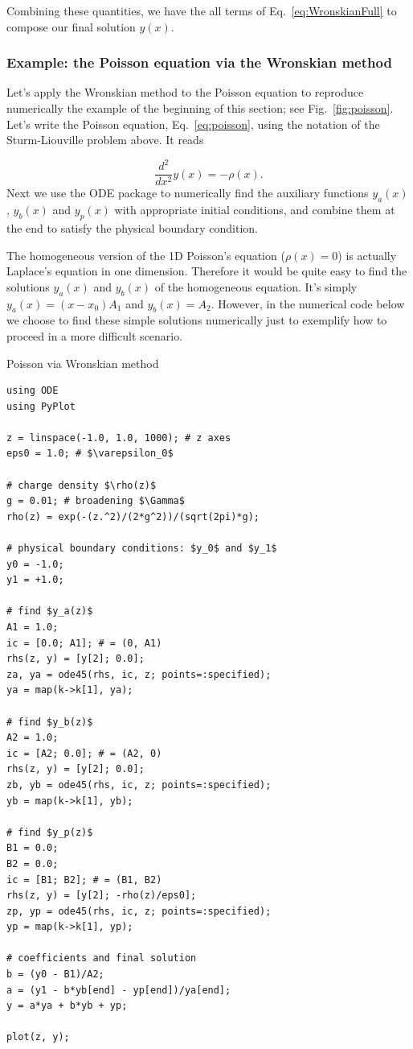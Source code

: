 Combining these quantities, we have the all terms of Eq.~\eqref{eq:WronskianFull} to compose our final solution $y(x)$.

\subsubsection{Example: the Poisson equation via the Wronskian method}

Let's apply the Wronskian method to the Poisson equation to reproduce numerically the example of the beginning of this section; see Fig.~\ref{fig:poisson}. Let's write the Poisson equation, Eq.~\eqref{eq:poisson}, using the notation of the Sturm-Liouville problem above. It reads

\begin{equation}
 \dfrac{d^2}{dx^2} y(x) = -\rho(x).
\end{equation}
Next we use the ODE package to numerically find the auxiliary functions $y_a(x)$, $y_b(x)$ and $y_p(x)$ with appropriate initial conditions, and combine them at the end to satisfy the physical boundary condition.

The homogeneous version of the 1D Poisson's equation ($\rho(x) = 0$) is actually Laplace's equation in one dimension. Therefore it would be quite easy to find the solutions $y_a(x)$ and $y_b(x)$ of the homogeneous equation. It's simply $y_a(x) = (x-x_0)A_1$ and $y_b(x) = A_2$. However, in the numerical code below we choose to find these simple solutions numerically just to exemplify how to proceed in a more difficult scenario.

\begin{example}{Poisson via Wronskian method}
\label{ex:poissonWronskian}
\begin{verbatim}
using ODE
using PyPlot

z = linspace(-1.0, 1.0, 1000); # z axes
eps0 = 1.0; # $\varepsilon_0$

# charge density $\rho(z)$
g = 0.01; # broadening $\Gamma$
rho(z) = exp(-(z.^2)/(2*g^2))/(sqrt(2pi)*g);

# physical boundary conditions: $y_0$ and $y_1$
y0 = -1.0;
y1 = +1.0;

# find $y_a(z)$
A1 = 1.0;
ic = [0.0; A1]; # = (0, A1)
rhs(z, y) = [y[2]; 0.0];
za, ya = ode45(rhs, ic, z; points=:specified);
ya = map(k->k[1], ya);

# find $y_b(z)$
A2 = 1.0;
ic = [A2; 0.0]; # = (A2, 0)
rhs(z, y) = [y[2]; 0.0];
zb, yb = ode45(rhs, ic, z; points=:specified);
yb = map(k->k[1], yb);

# find $y_p(z)$
B1 = 0.0;
B2 = 0.0;
ic = [B1; B2]; # = (B1, B2)
rhs(z, y) = [y[2]; -rho(z)/eps0];
zp, yp = ode45(rhs, ic, z; points=:specified);
yp = map(k->k[1], yp);

# coefficients and final solution
b = (y0 - B1)/A2;
a = (y1 - b*yb[end] - yp[end])/ya[end];
y = a*ya + b*yb + yp;

plot(z, y);
\end{verbatim}
\end{example}

